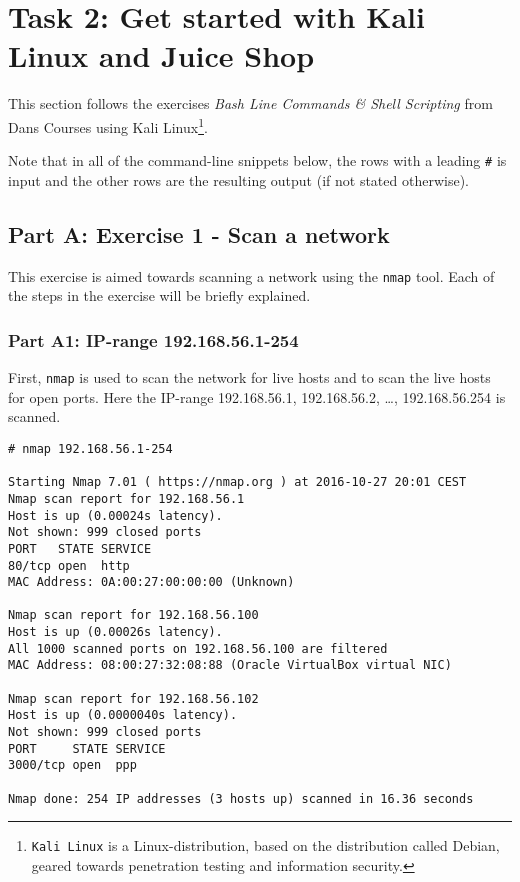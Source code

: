 \pagebreak
\section{Task 2: Get started with Kali Linux and Juice Shop}
This section follows the exercises \textit{Bash Line Commands \& Shell
  Scripting} from Dans Courses\cite{DANSCOURSES} using Kali Linux\footnote{
  \texttt{Kali Linux} is a Linux-distribution, based on the distribution
called Debian\cite{KALIDEBIAN}, geared towards penetration testing and
information security.
}.

Note that in all of the command-line snippets below, the rows with
a leading \texttt{\#} is input and the other rows are the resulting
output (if not stated otherwise).

\subsection{Part A: Exercise 1 - Scan a network}
This exercise is aimed towards scanning a network using the
\texttt{nmap} tool. Each of the steps in the exercise will
be briefly explained.

\subsubsection{Part A1: IP-range 192.168.56.1-254}
\label{sec:parta1}
First, \texttt{nmap} is used to scan the network for live
hosts and to scan the live hosts for open ports. Here
the IP-range 192.168.56.1, 192.168.56.2, \dots, 192.168.56.254
is scanned.

\begin{lstlisting}[numbers=none, language={}, frame=single, framexleftmargin={0.2em}]
# nmap 192.168.56.1-254

Starting Nmap 7.01 ( https://nmap.org ) at 2016-10-27 20:01 CEST
Nmap scan report for 192.168.56.1
Host is up (0.00024s latency).
Not shown: 999 closed ports
PORT   STATE SERVICE
80/tcp open  http
MAC Address: 0A:00:27:00:00:00 (Unknown)

Nmap scan report for 192.168.56.100
Host is up (0.00026s latency).
All 1000 scanned ports on 192.168.56.100 are filtered
MAC Address: 08:00:27:32:08:88 (Oracle VirtualBox virtual NIC)

Nmap scan report for 192.168.56.102
Host is up (0.0000040s latency).
Not shown: 999 closed ports
PORT     STATE SERVICE
3000/tcp open  ppp

Nmap done: 254 IP addresses (3 hosts up) scanned in 16.36 seconds
\end{lstlisting}


